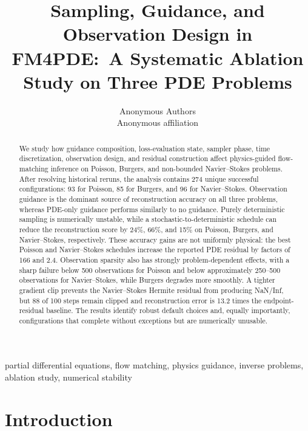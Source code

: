\documentclass[twoside,11pt]{article}
\begin{document}
\title{Sampling, Guidance, and Observation Design in FM4PDE:\
A Systematic Ablation Study on Three PDE Problems}

\author{\name Anonymous Authors \\
        \addr Anonymous affiliation}

\maketitle

\begin{abstract}
We study how guidance composition, loss-evaluation state, sampler phase,
time discretization, observation design, and residual construction affect
physics-guided flow-matching inference on Poisson, Burgers, and non-bounded
Navier--Stokes problems.  After resolving historical reruns, the analysis
contains 274 unique successful configurations: 93 for Poisson, 85 for
Burgers, and 96 for Navier--Stokes.  Observation guidance is the dominant
source of reconstruction accuracy on all three problems, whereas PDE-only
guidance performs similarly to no guidance.  Purely deterministic sampling
is numerically unstable, while a stochastic-to-deterministic schedule can
reduce the reconstruction score by 24\%, 66\%, and 15\% on Poisson,
Burgers, and Navier--Stokes, respectively.  These accuracy gains are not
uniformly physical: the best Poisson and Navier--Stokes schedules increase
the reported PDE residual by factors of 166 and 2.4.  Observation sparsity
also has strongly problem-dependent effects, with a sharp failure below 500
observations for Poisson and below approximately 250--500 observations for
Navier--Stokes, while Burgers degrades more smoothly.  A tighter gradient
clip prevents the Navier--Stokes Hermite residual from producing NaN/Inf,
but 88 of 100 steps remain clipped and reconstruction error is 13.2 times
the endpoint-residual baseline.  The results identify robust default choices
and, equally importantly, configurations that complete without exceptions
but are numerically unusable.
\end{abstract}

\begin{keywords}
  partial differential equations, flow matching, physics guidance,
  inverse problems, ablation study, numerical stability
\end{keywords}

\section{Introduction}
\label{sec:introduction}
\end{document}
